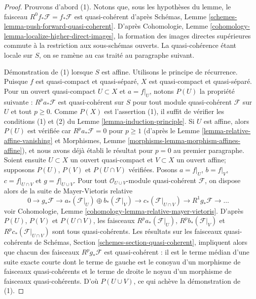 \begin{proof}
Prouvons d'abord (1). Notons que, sous les hypothèses du lemme, le faisceau
$R^0f_*\mathcal{F} = f_*\mathcal{F}$ est quasi-cohérent d'après
Schémas, Lemme \ref{schemes-lemma-push-forward-quasi-coherent}.
D'après
Cohomologie, Lemme \ref{cohomology-lemma-localize-higher-direct-images},
la formation des images directes supérieures commute à la restriction
aux sous-schémas ouverts. La quasi-cohérence étant locale sur $S$, on
se ramène au cas traité au paragraphe suivant.

\medskip\noindent
Démonstration de (1) lorsque $S$ est affine. Utilisons le principe de récurrence.
Puisque $f$ est quasi-compact et quasi-séparé, $X$
est quasi-compact et quasi-séparé. Pour un ouvert quasi-compact $U \subset X$
et $a = f|_U$, notons $P(U)$ la propriété suivante :
$R^pa_*\mathcal{F}$ est quasi-cohérent sur $S$ pour tout module quasi-cohérent
$\mathcal{F}$ sur $U$ et tout $p \geq 0$. Comme $P(X)$ est l'assertion (1), il suffit
de vérifier les conditions (1) et (2) du Lemme \ref{lemma-induction-principle}.
Si $U$ est affine, alors $P(U)$ est vérifiée car $R^pa_*\mathcal{F} = 0$ pour
$p \geq 1$ (d'après le Lemme \ref{lemma-relative-affine-vanishing} et
Morphismes, Lemme \ref{morphisms-lemma-morphism-affines-affine}),
et nous avons déjà établi le résultat pour $p = 0$ au premier
paragraphe. Soient ensuite $U \subset X$ un ouvert quasi-compact et $V \subset X$
un ouvert affine; supposons $P(U)$, $P(V)$ et $P(U \cap V)$ vérifiées.
Posons $a = f|_U$, $b = f|_V$, $c = f|_{U \cap V}$ et $g = f|_{U \cup V}$.
Pour tout $\mathcal{O}_{U \cup V}$-module quasi-cohérent $\mathcal{F}$,
on dispose alors de la suite de Mayer-Vietoris relative
$$
0 \to
g_*\mathcal{F} \to
a_*(\mathcal{F}|_U) \oplus b_*(\mathcal{F}|_V) \to
c_*(\mathcal{F}|_{U \cap V}) \to
R^1g_*\mathcal{F} \to \ldots
$$
voir Cohomologie, Lemme \ref{cohomology-lemma-relative-mayer-vietoris}.
D'après $P(U)$, $P(V)$ et $P(U \cap V)$, les faisceaux
$R^pa_*(\mathcal{F}|_U)$, $R^pb_*(\mathcal{F}|_V)$ et
$R^pc_*(\mathcal{F}|_{U \cap V})$ sont tous quasi-cohérents.
Les résultats sur les faisceaux quasi-cohérents de
Schémas, Section \ref{schemes-section-quasi-coherent},
impliquent alors que chacun des faisceaux
$R^pg_*\mathcal{F}$ est quasi-cohérent : il est le terme médian d'une suite
exacte courte dont le terme de gauche est le conoyau d'un morphisme de faisceaux quasi-cohérents
et le terme de droite le noyau d'un morphisme de faisceaux quasi-cohérents.
D'où $P(U \cup V)$, ce qui achève la démonstration de (1).


\end{proof}
